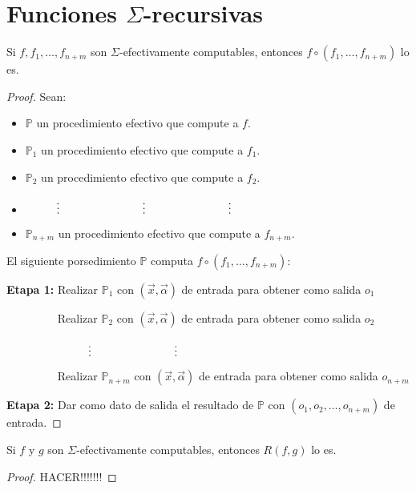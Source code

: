 \section{Funciones $\Sigma$-recursivas}


  \begin{lemma}
    \par Si $f, f_{1}, \dotsc, f_{n+m}$ son $\Sigma$-efectivamente computables, entonces $f \circ (f_{1}, \dotsc,
    f_{n+m})$ lo es.
  \end{lemma}
  \begin{proof}
    Sean:

    \begin{itemize}
      \item $\mathbb{P}$ un procedimiento efectivo que compute a $f$.
      \item $\mathbb{P}_{1}$ un procedimiento efectivo que compute a $f_{1}$.
      \item $\mathbb{P}_{2}$ un procedimiento efectivo que compute a $f_{2}$.
      \item $\vdotswithin{(n-1)m+1} \qquad \vdotswithin{(n-1)m+2} \qquad \vdotswithin{(n-1)m+r}$
      \item $\mathbb{P}_{n+m}$ un procedimiento efectivo que compute a $f_{n+m}$.
    \end{itemize}

    \par El siguiente porsedimiento $\mathbb{P}$ computa $f \circ (f_{1}, \dotsc, f_{n+m})$:

    \vspace{3mm}
    \textbf{Etapa 1:}
    Realizar $\mathbb{P}_{1}$ con $(\vec{x}, \vec{\alpha})$ de entrada para obtener como salida $o_{1}$

    $\qquad\qquad\;\;$Realizar $\mathbb{P}_{2}$ con $(\vec{x}, \vec{\alpha})$ de entrada para obtener como salida $o_{2}$

    $\qquad\qquad\;\;\vdotswithin{(n-1)m+1} \qquad \vdotswithin{(n-1)m+2}$

    $\qquad\qquad\;\;$Realizar $\mathbb{P}_{n+m}$ con $(\vec{x}, \vec{\alpha})$ de entrada para obtener como salida $o_{n+m}$


    \textbf{Etapa 2:}
    Dar como dato de salida el resultado de $\mathbb{P}$ con $(o_{1}, o_{2}, \dotsc, o_{n+m})$ de entrada.
  \end{proof}

  \begin{lemma}
    \par Si $f$ y $g$ son $\Sigma $-efectivamente computables, entonces $R(f,g)$ lo es.
  \end{lemma}
  \begin{proof}
    HACER!!!!!!!
  \end{proof}

